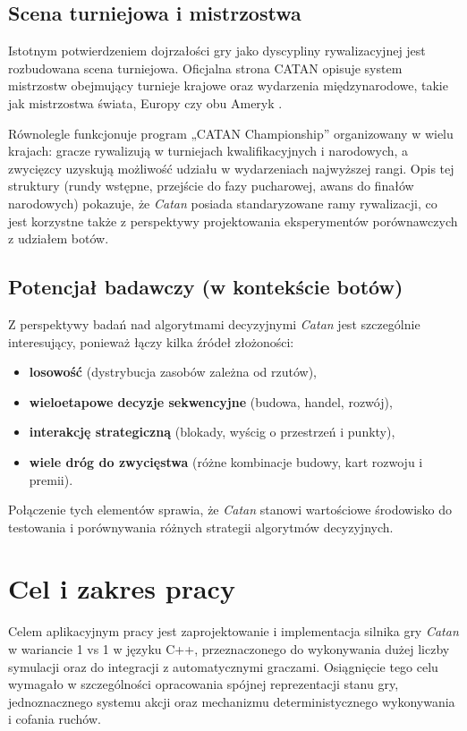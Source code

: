 \documentclass[polish,inz,longabstract]{iithesis}
\begin{document}
\subsection{Scena turniejowa i mistrzostwa}

Istotnym potwierdzeniem dojrzałości gry jako dyscypliny rywalizacyjnej jest rozbudowana scena turniejowa. Oficjalna strona CATAN opisuje system mistrzostw obejmujący turnieje krajowe oraz wydarzenia międzynarodowe, takie jak mistrzostwa świata, Europy czy obu Ameryk \cite{8}.

Równolegle funkcjonuje program „CATAN Championship” organizowany w wielu krajach: gracze rywalizują w turniejach kwalifikacyjnych i narodowych, a zwycięzcy uzyskują możliwość udziału w wydarzeniach najwyższej rangi. Opis tej struktury (rundy wstępne, przejście do fazy pucharowej, awans do finałów narodowych) pokazuje, że \textit{Catan} posiada standaryzowane ramy rywalizacji, co jest korzystne także z perspektywy projektowania eksperymentów porównawczych z udziałem botów.

\subsection{Potencjał badawczy (w kontekście botów)}

Z perspektywy badań nad algorytmami decyzyjnymi \textit{Catan} jest szczególnie interesujący, ponieważ łączy kilka źródeł złożoności:

\begin{itemize}
\item \textbf{losowość} (dystrybucja zasobów zależna od rzutów),
\item \textbf{wieloetapowe decyzje sekwencyjne} (budowa, handel, rozwój),
\item \textbf{interakcję strategiczną} (blokady, wyścig o przestrzeń i punkty),
\item \textbf{wiele dróg do zwycięstwa} (różne kombinacje budowy, kart rozwoju i premii).
\end{itemize}

Połączenie tych elementów sprawia, że \textit{Catan} stanowi wartościowe środowisko do testowania i porównywania różnych strategii algorytmów decyzyjnych.

\section{Cel i zakres pracy}

Celem aplikacyjnym pracy jest zaprojektowanie i implementacja silnika gry \textit{Catan} w wariancie 1 vs 1 w języku C++, przeznaczonego do wykonywania dużej liczby symulacji oraz do integracji z automatycznymi graczami. Osiągnięcie tego celu wymagało w szczególności opracowania spójnej reprezentacji stanu gry, jednoznacznego systemu akcji oraz mechanizmu deterministycznego wykonywania i cofania ruchów.
\end{document}
